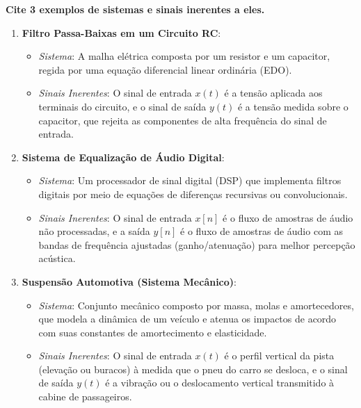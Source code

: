 \textbf{Cite 3 exemplos de sistemas e sinais inerentes a eles.}

\begin{enumerate}
\def\labelenumi{\arabic{enumi}.}
\tightlist
\item
  \textbf{Filtro Passa-Baixas em um Circuito RC}:

  \begin{itemize}
  \tightlist
  \item
    \emph{Sistema}: A malha elétrica composta por um resistor e um capacitor, regida por uma equação diferencial linear ordinária (EDO).
  \item
    \emph{Sinais Inerentes}: O sinal de entrada \(x(t)\) é a tensão aplicada aos terminais do circuito, e o sinal de saída \(y(t)\) é a tensão medida sobre o capacitor, que rejeita as componentes de alta frequência do sinal de entrada.
  \end{itemize}
\item
  \textbf{Sistema de Equalização de Áudio Digital}:

  \begin{itemize}
  \tightlist
  \item
    \emph{Sistema}: Um processador de sinal digital (DSP) que implementa filtros digitais por meio de equações de diferenças recursivas ou convolucionais.
  \item
    \emph{Sinais Inerentes}: O sinal de entrada \(x[n]\) é o fluxo de amostras de áudio não processadas, e a saída \(y[n]\) é o fluxo de amostras de áudio com as bandas de frequência ajustadas (ganho/atenuação) para melhor percepção acústica.
  \end{itemize}
\item
  \textbf{Suspensão Automotiva (Sistema Mecânico)}:

  \begin{itemize}
  \tightlist
  \item
    \emph{Sistema}: Conjunto mecânico composto por massa, molas e amortecedores, que modela a dinâmica de um veículo e atenua os impactos de acordo com suas constantes de amortecimento e elasticidade.
  \item
    \emph{Sinais Inerentes}: O sinal de entrada \(x(t)\) é o perfil vertical da pista (elevação ou buracos) à medida que o pneu do carro se desloca, e o sinal de saída \(y(t)\) é a vibração ou o deslocamento vertical transmitido à cabine de passageiros.
  \end{itemize}
\end{enumerate}

